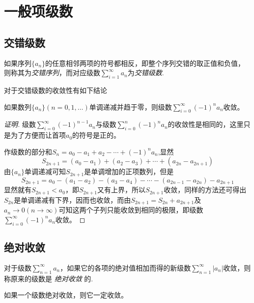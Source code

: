 
\section{一般项级数}
\label{sec:signed-series}

\subsection{交错级数}
\label{sec:alternating-sign-series}

\begin{definition}
  如果序列$\{a_n\}$的任意相邻两项的符号都相反，即整个序列交错的取正值和负值，则称其为\emph{交错序列}，而对应级数$\sum_{i=1}^{\infty}a_n$为\emph{交错级数}.
\end{definition}

对于交错级数的收敛性有如下结论

\begin{theorem}
  如果数列$\{a_n\}(n=0,1,\ldots)$单调递减并趋于零，则级数$\sum_{i=0}^{\infty}(-1)^{n}a_n$收敛。
\end{theorem}

\begin{proof}[证明]
级数$\sum_{i=0}^{\infty}(-1)^{n-1}a_n$与级数$\sum_{i=0}^n(-1)^na_n$的收敛性是相同的，这里只是为了方便而让首项$a_0$的符号是正的。  

作级数的部分和$S_n=a_0-a_1+a_2-\cdots+(-1)^na_n$,显然
\[ S_{2n+1}=(a_0-a_1)+(a_2-a_3)+\cdots+(a_{2n}-a_{2n+1}) \]
由$\{a_n\}$单调递减可知$S_{2n+1}$是单调增加的正项数列，但是
\[ S_{2n+1}=a_0-(a_1-a_2)-(a_3-a_4)-\cdots-(a_{2n-1}-a_{2n})-a_{2n+1} \]
显然就有$S_{2n+1}<a_0$，即$S_{2n+1}$又有上界，所以$S_{2n+1}$收敛，同样的方法还可得出$S_{2n}$是单调递减有下界，因而也收敛，而由$S_{2n+1}=S_{2n}+a_{2n+1}$及$a_n \to 0(n \to \infty)$可知这两个子列只能收敛到相同的极限，即级数$\sum_{i=0}^{\infty}(-1)^na_n$收敛。
\end{proof}

\subsection{绝对收敛}
\label{sec:abs-converage-series-and-its-properties}

\begin{definition}
  对于级数$\sum_{n=1}^{\infty}a_n$，如果它的各项的绝对值相加而得的新级数$\sum_{n=1}^{\infty}|a_n|$收敛，则称原来的级数是 \emph{绝对收敛} 的.
\end{definition}

\begin{theorem}
  如果一个级数绝对收敛，则它一定收敛。
\end{theorem}

